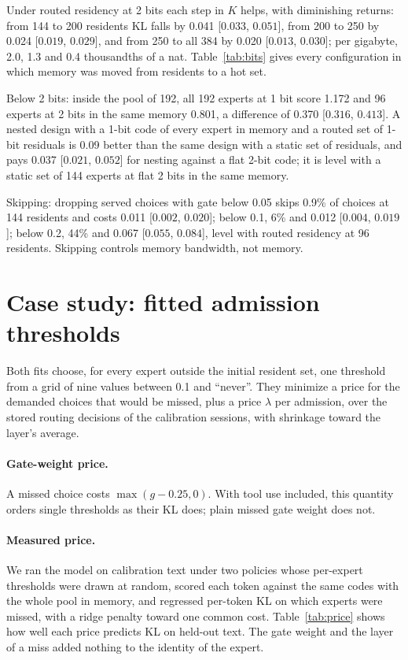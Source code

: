 \documentclass[11pt]{article}
\newcommand{\ci}[2]{[$#1$, $#2$]}
\begin{document}
Under routed residency at 2 bits each step in $K$ helps, with diminishing returns: from 144 to
200 residents KL falls by 0.041 \ci{0.033}{0.051}, from 200 to 250 by 0.024 \ci{0.019}{0.029},
and from 250 to all 384 by 0.020 \ci{0.013}{0.030}; per gigabyte, 2.0, 1.3 and 0.4 thousandths
of a nat. Table~\ref{tab:bits} gives every configuration in which memory was moved from
residents to a hot set.

Below 2 bits: inside the pool of 192, all 192 experts at 1 bit score 1.172 and 96 experts at 2
bits in the same memory 0.801, a difference of 0.370 \ci{0.316}{0.413}. A nested design with a
1-bit code of every expert in memory and a routed set of 1-bit residuals is 0.09 better than the same design with a static set of residuals, and pays 0.037 \ci{0.021}{0.052} for nesting
against a flat 2-bit code; it is level with a static set of 144 experts at flat 2 bits in the
same memory.

Skipping: dropping served choices with gate below 0.05 skips 0.9\% of choices at 144 residents
and costs 0.011 \ci{0.002}{0.020}; below 0.1, 6\% and 0.012 \ci{0.004}{0.019}; below 0.2, 44\%
and 0.067 \ci{0.055}{0.084}, level with routed residency at 96 residents. Skipping controls
memory bandwidth, not memory.

\FloatBarrier
\section{Case study: fitted admission thresholds}
\label{app:admission}

Both fits choose, for every expert outside the initial resident set, one threshold from a grid
of nine values between 0.1 and ``never''. They minimize a price for the demanded choices that
would be missed, plus a price $\lambda$ per admission, over the stored routing decisions of the
calibration sessions, with shrinkage toward the layer's average.

\paragraph{Gate-weight price.} A missed choice costs $\max(g-0.25,0)$. With tool use included, this quantity orders single thresholds as their KL does; plain missed gate weight does not.

\paragraph{Measured price.} We ran the model on calibration text under two policies whose
per-expert thresholds were drawn at random, scored each token against the same codes with the
whole pool in memory, and regressed per-token KL on which experts were missed, with a ridge
penalty toward one common cost. Table~\ref{tab:price} shows how well each price predicts KL on
held-out text. The gate weight and the layer of a miss added nothing to the identity of the
expert.
\end{document}
